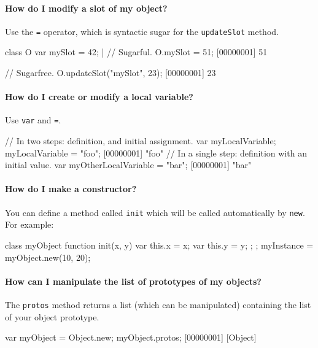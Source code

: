 \paragraph{How do I modify a slot of my object?}

Use the \lstinline|=| operator, which is syntactic sugar for the
\lstinline|updateSlot| method.

\begin{urbiscript}[firstnumber=last]
class O
{
  var mySlot = 42;
}|
// Sugarful.
O.mySlot = 51;
[00000001] 51

// Sugarfree.
O.updateSlot("mySlot", 23);
[00000001] 23
\end{urbiscript}

\paragraph{How do I create or modify a local variable?}
Use \lstinline|var| and \lstinline|=|.

\begin{urbiscript}[firstnumber=last]
// In two steps: definition, and initial assignment.
var myLocalVariable;
myLocalVariable = "foo";
[00000001] "foo"
// In a single step: definition with an initial value.
var myOtherLocalVariable = "bar";
[00000001] "bar"
\end{urbiscript}


\paragraph{How do I make a constructor?}
You can define a method called \lstinline{init} which will be called
automatically by \lstinline{new}. For example:

\begin{urbifixme}
class myObject {
  function init(x, y) {
    var this.x = x;
    var this.y = y;
  };
};
myInstance = myObject.new(10, 20);
\end{urbifixme}


\paragraph{How can I manipulate the list of prototypes of my objects?}
The \lstinline{protos} method returns a list (which can be manipulated)
containing the list of your object prototype.

\begin{urbifixme}
var myObject = Object.new;
myObject.protos;
[00000001] [Object]
\end{urbifixme}


